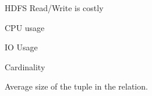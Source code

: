 \documentclass{vldb}
\newcommand{\ii}{\item}
\begin{document}
\ii HDFS Read/Write is costly
\ii CPU usage
\ii IO Usage
\ii Cardinality
\ii Average size of the tuple in the relation.
\end{document}
